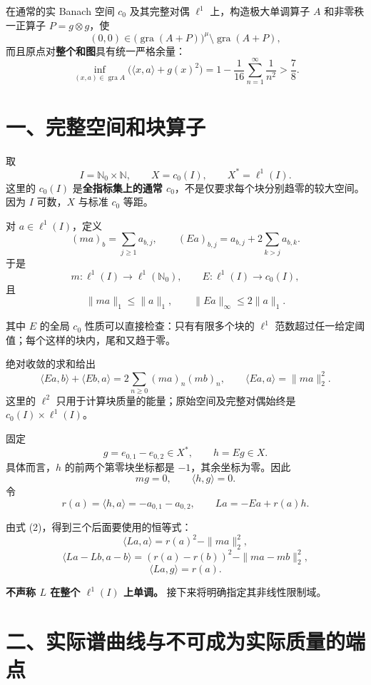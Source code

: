\documentclass[UTF8,fontset=fandol,11pt,a4paper]{ctexart}
\begin{document}
在通常的实 Banach 空间 $c_0$ 及其完整对偶 $\ell^1$ 上，构造极大单调算子 $A$ 和非零秩一正算子 $P=g\otimes g$，使 \[
\boxed{
(0,0)\in
\bigl(\operatorname{gra}(A+P)\bigr)^\mu
\setminus\operatorname{gra}(A+P),
}
\] 而且原点对\textbf{整个和图}具有统一严格余量： \[
\boxed{
\inf_{(x,a)\in\operatorname{gra}A}
\bigl(\langle x,a\rangle+g(x)^2\bigr)
=
1-\frac1{16}\sum_{n=1}^{\infty}\frac1{n^2}
>\frac78.
}
\]

\section{一、完整空间和块算子}\label{ux4e00ux5b8cux6574ux7a7aux95f4ux548cux5757ux7b97ux5b50}

取 \[
I=\mathbb N_0\times\mathbb N,\qquad
X=c_0(I),\qquad X^*=\ell^1(I).
\] 这里的 $c_0(I)$ 是\textbf{全指标集上的通常 $c_0$}，不是仅要求每个块分别趋零的较大空间。因为 $I$ 可数，$X$ 与标准 $c_0$ 等距。

对 $a\in\ell^1(I)$，定义 \[
(ma)_b=\sum_{j\ge1}a_{b,j},
\qquad
(Ea)_{b,j}=a_{b,j}+2\sum_{k>j}a_{b,k}.
\tag{1}
\] 于是 \[
m:\ell^1(I)\to\ell^1(\mathbb N_0),
\qquad
E:\ell^1(I)\to c_0(I),
\] 且 \[
\|ma\|_1\le\|a\|_1,\qquad
\|Ea\|_\infty\le2\|a\|_1.
\]

其中 $E$ 的全局 $c_0$ 性质可以直接检查：只有有限多个块的 $\ell^1$ 范数超过任一给定阈值；每个这样的块内，尾和又趋于零。

绝对收敛的求和给出 \[
\boxed{
\langle Ea,b\rangle+\langle Eb,a\rangle
=2\sum_{n\ge0}(ma)_n(mb)_n,
\qquad
\langle Ea,a\rangle=\|ma\|_2^2.
}
\tag{2}
\] 这里的 $\ell^2$ 只用于计算块质量的能量；原始空间及完整对偶始终是 $c_0(I)\times\ell^1(I)$。

固定 \[
g=e_{0,1}-e_{0,2}\in X^*,
\qquad h=Eg\in X.
\] 具体而言，$h$ 的前两个第零块坐标都是 $-1$，其余坐标为零。因此 \[
mg=0,\qquad \langle h,g\rangle=0.
\] 令 \[
r(a)=\langle h,a\rangle=-a_{0,1}-a_{0,2},
\qquad
La=-Ea+r(a)h.
\tag{3}
\]

由式 (2)，得到三个后面要使用的恒等式： \[
\boxed{
\langle La,a\rangle=r(a)^2-\|ma\|_2^2,
}
\tag{4}
\] \[
\boxed{
\langle La-Lb,a-b\rangle
=(r(a)-r(b))^2-\|ma-mb\|_2^2,
}
\tag{5}
\] \[
\boxed{\langle La,g\rangle=r(a).}
\tag{6}
\]

\textbf{不声称 $L$ 在整个 $\ell^1(I)$ 上单调。} 接下来将明确指定其非线性限制域。

\section{二、实际谱曲线与不可成为实际质量的端点}\label{ux4e8cux5b9eux9645ux8c31ux66f2ux7ebfux4e0eux4e0dux53efux6210ux4e3aux5b9eux9645ux8d28ux91cfux7684ux7aefux70b9}
\end{document}
